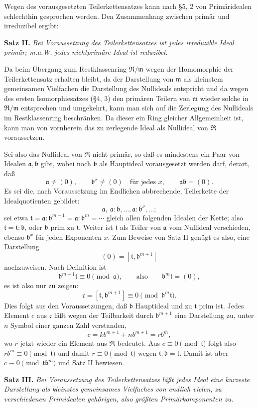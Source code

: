 \documentclass[11pt]{article}
\providecommand{\mR}{\mathfrak{R}}
\providecommand{\ma}{\mathfrak{a}}
\providecommand{\mb}{\mathfrak{b}}
\providecommand{\mc}{\mathfrak{c}}
\providecommand{\mm}{\mathfrak{m}}
\providecommand{\mt}{\mathfrak{t}}
\begin{document}
Wegen des vorausgesetzten Teilerkettensatzes kann nach §5, 2 von Primäridealen schlechthin gesprochen werden. Den Zusammenhang zwischen primär und irreduzibel ergibt:

\textbf{Satz II.} \emph{Bei Voraussetzung des Teilerkettensatzes ist jedes irreduzible Ideal primär; m.a.W. jedes nichtprimäre Ideal ist reduzibel.}

Da beim Übergang zum Restklassenring $\mR/\mm$ wegen der Homomorphie der Teilerkettensatz erhalten bleibt, da der Darstellung von $\mm$ als kleinstem gemeinsamen Vielfachen die Darstellung des Nullideals entspricht und da wegen des ersten Isomorphiesatzes (§4, 3) den primären Teilern von $\mm$ wieder solche in $\mR/\mm$ entsprechen und umgekehrt, kann man sich auf die Zerlegung des Nullideals im Restklassenring beschränken. Da dieser ein Ring gleicher Allgemeinheit ist, kann man von vornherein das zu zerlegende Ideal als Nullideal von $\mR$ voraussetzen.

Sei also das Nullideal von $\mR$ nicht primär, so daß es mindestens ein Paar von Idealen $\ma,\mb$ gibt, wobei noch $\mb$ als Hauptideal vorausgesetzt werden darf, derart, daß
\[
\ma\ne(0),\qquad \mb^x\ne(0)\quad\text{für jedes }x,
\qquad \ma\mb=(0).
\]
Es sei die, nach Voraussetzung im Endlichen abbrechende, Teilerkette der Idealquotienten gebildet:
\[
\ma,\ \ma:\mb,\ldots,\ma:\mb^\nu,\ldots;
\]
sei etwa $\mt=\ma:\mb^{m-1}=\ma:\mb^m=\cdots$ gleich allen folgenden Idealen der Kette; also $\mt=\mt:\mb$, oder $\mb$ prim zu $\mt$. Weiter ist $\mt$ als Teiler von $\ma$ vom Nullideal verschieden, ebenso $\mb^x$ für jeden Exponenten $x$. Zum Beweise von Satz II genügt es also, eine Darstellung
\[
(0)=[\mt,\mb^{m+1}]
\]
nachzuweisen. Nach Definition ist
\[
\mb^{m-1}\mt\equiv0\pmod{\ma},\qquad\text{also}\qquad \mb^m\mt=(0),
\]
es ist also nur zu zeigen:
\[
\mc=[\mt,\mb^{m+1}]\equiv0\pmod{\mb^m\mt}.
\]
Dies folgt aus den Voraussetzungen, daß $\mb$ Hauptideal und zu $\mt$ prim ist. Jedes Element $c$ aus $\mc$ läßt wegen der Teilbarkeit durch $\mb^{m+1}$ eine Darstellung zu, unter $n$ Symbol einer ganzen Zahl verstanden,
\[
 c=k b^{m+1}+n b^{m+1}=r b^m,
\]
wo $r$ jetzt wieder ein Element aus $\mR$ bedeutet. Aus $c\equiv0\pmod{\mt}$ folgt also $r b^m\equiv0\pmod{\mt}$ und damit $r\equiv0\pmod{\mt}$ wegen $\mt:\mb=\mt$. Damit ist aber $c\equiv0\pmod{\mt\mb^m}$ und Satz II bewiesen.

\textbf{Satz III.} \emph{Bei Voraussetzung des Teilerkettensatzes läßt jedes Ideal eine kürzeste Darstellung als kleinstes gemeinsames Vielfaches von endlich vielen, zu verschiedenen Primidealen gehörigen, also größten Primärkomponenten zu.}
\end{document}
